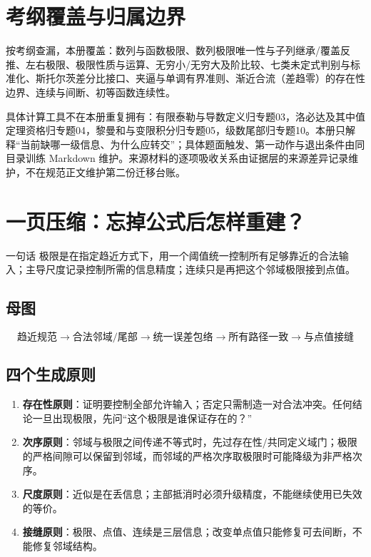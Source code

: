 \documentclass[11pt,a4paper]{ctexart}
\newcommand{\kw}[1]{\textbf{\color{deep}#1}}
\begin{document}
\section{考纲覆盖与归属边界}

按考纲查漏，本册覆盖：数列与函数极限、数列极限唯一性与子列继承/覆盖反推、左右极限、极限性质与运算、无穷小/无穷大及阶比较、七类未定式判别与标准化、斯托尔茨差分比接口、夹逼与单调有界准则、渐近合流（差趋零）的存在性边界、连续与间断、初等函数连续性。

具体计算工具不在本册重复拥有：有限泰勒与导数定义归专题03，洛必达及其中值定理资格归专题04，黎曼和与变限积分归专题05，级数尾部归专题10。本册只解释“当前缺哪一级信息、为什么应转交”；具体题面触发、第一动作与退出条件由同目录训练 Markdown 维护。来源材料的逐项吸收关系由证据层的来源差异记录维护，不在规范正文维护第二份迁移台账。

\section{一页压缩：忘掉公式后怎样重建？}

\begin{corebox}{一句话}
极限是在指定趋近方式下，用一个阈值统一控制所有足够靠近的合法输入；主导尺度记录控制所需的信息精度；连续只是再把这个邻域极限接到点值。
\end{corebox}

\subsection{母图}
\[
\boxed{
\text{趋近规范}
\to \text{合法邻域/尾部}
\to \text{统一误差包络}
\to \text{所有路径一致}
\to \text{与点值接缝}}
\]

\subsection{四个生成原则}
\begin{enumerate}
  \item \kw{存在性原则}：证明要控制全部允许输入；否定只需制造一对合法冲突。任何结论一旦出现极限，先问“这个极限是谁保证存在的？”
  \item \kw{次序原则}：邻域与极限之间传递不等式时，先过存在性/共同定义域门；极限的严格间隙可以保留到邻域，而邻域的严格次序取极限时可能降级为非严格次序。
  \item \kw{尺度原则}：近似是在丢信息；主部抵消时必须升级精度，不能继续使用已失效的等价。
  \item \kw{接缝原则}：极限、点值、连续是三层信息；改变单点值只能修复可去间断，不能修复邻域结构。
\end{enumerate}
\end{document}
